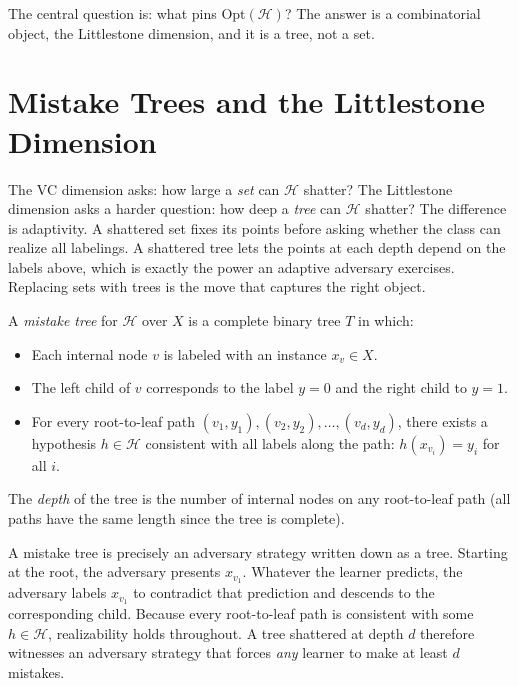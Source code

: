The central question is: what pins $\mathrm{Opt}(\mathcal{H})$? The answer is a combinatorial object, the Littlestone dimension, and it is a tree, not a set.


\section{Mistake Trees and the Littlestone Dimension}
\label{sec:mistake-trees}

The VC dimension asks: how large a \emph{set} can $\mathcal{H}$ shatter? The Littlestone dimension asks a harder question: how deep a \emph{tree} can $\mathcal{H}$ shatter? The difference is adaptivity. A shattered set fixes its points before asking whether the class can realize all labelings. A shattered tree lets the points at each depth depend on the labels above, which is exactly the power an adaptive adversary exercises. Replacing sets with trees is the move that captures the right object.

\begin{defn}
\label{def:mistake-tree}
A \emph{mistake tree} for $\mathcal{H}$ over $X$ is a complete binary tree $T$ in which:
\begin{itemize}[leftmargin=*, itemsep=2pt]
\item Each internal node $v$ is labeled with an instance $x_v \in X$.
\item The left child of $v$ corresponds to the label $y = 0$ and the right child to $y = 1$.
\item For every root-to-leaf path $(v_1, y_1), (v_2, y_2), \ldots, (v_d, y_d)$, there exists a hypothesis $h \in \mathcal{H}$ consistent with all labels along the path: $h(x_{v_i}) = y_i$ for all $i$.
\end{itemize}
The \emph{depth} of the tree is the number of internal nodes on any root-to-leaf path (all paths have the same length since the tree is complete).
\end{defn}

A mistake tree is precisely an adversary strategy written down as a tree. Starting at the root, the adversary presents $x_{v_1}$. Whatever the learner predicts, the adversary labels $x_{v_1}$ to contradict that prediction and descends to the corresponding child. Because every root-to-leaf path is consistent with some $h \in \mathcal{H}$, realizability holds throughout. A tree shattered at depth $d$ therefore witnesses an adversary strategy that forces \emph{any} learner to make at least $d$ mistakes.

